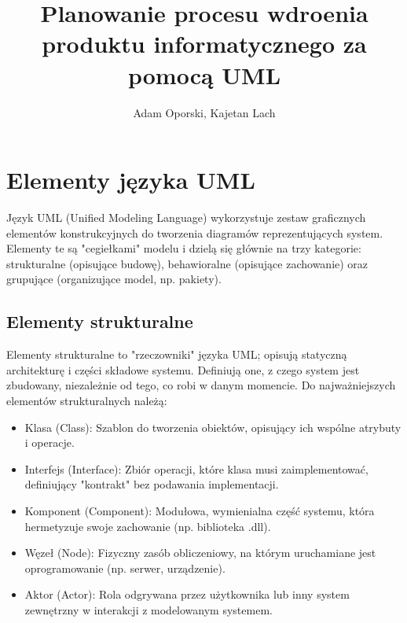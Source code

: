 \documentclass[a4paper,12pt]{article}
\title{Planowanie procesu wdroenia produktu informatycznego za pomocą UML}
\author{Adam Oporski, Kajetan Lach}
\begin{document}
\maketitle

\tableofcontents

\section{Elementy języka UML}
Język UML (Unified Modeling Language) wykorzystuje zestaw graficznych elementów konstrukcyjnych do tworzenia diagramów reprezentujących system. Elementy te są "cegiełkami" modelu i dzielą się głównie na trzy kategorie: strukturalne (opisujące budowę), behawioralne (opisujące zachowanie) oraz grupujące (organizujące model, np. pakiety).

\subsection{Elementy strukturalne}
Elementy strukturalne to "rzeczowniki" języka UML; opisują statyczną architekturę i części składowe systemu. Definiują one, z czego system jest zbudowany, niezależnie od tego, co robi w danym momencie. Do najważniejszych elementów strukturalnych należą:
\begin{itemize}
\item Klasa (Class): Szablon do tworzenia obiektów, opisujący ich wspólne atrybuty i operacje.
\item Interfejs (Interface): Zbiór operacji, które klasa musi zaimplementować, definiujący "kontrakt" bez podawania implementacji.
\item Komponent (Component): Modułowa, wymienialna część systemu, która hermetyzuje swoje zachowanie (np. biblioteka .dll).
\item Węzeł (Node): Fizyczny zasób obliczeniowy, na którym uruchamiane jest oprogramowanie (np. serwer, urządzenie).
\item Aktor (Actor): Rola odgrywana przez użytkownika lub inny system zewnętrzny w interakcji z modelowanym systemem.
\end{itemize}
\end{document}
